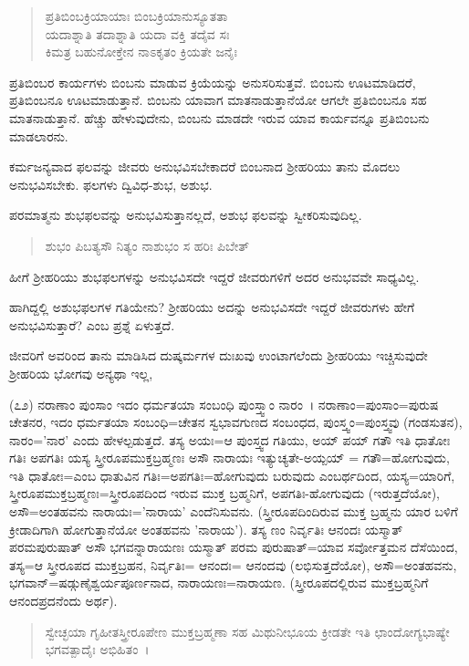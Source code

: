 \begin{verse}
ಪ್ರತಿಬಿಂಬಕ್ರಿಯಾಯಾಃ ಬಿಂಬಕ್ರಿಯಾನುಸ್ಯೂತತಾ\\ ಯದಾಶ್ನಾತಿ ತದಾಶ್ನಾತಿ ಯದಾ ವಕ್ತಿ ತದೈವ ಸಃ\\ ಕಿಮತ್ರ ಬಹುನೋಕ್ತೇನ ನಾಽಕೃತಂ ಕ್ರಿಯತೇ ಜನೈಃ
\end{verse}


ಪ್ರತಿಬಿಂಬರ ಕಾರ್ಯಗಳು ಬಿಂಬನು ಮಾಡುವ ಕ್ರಿಯೆಯನ್ನು ಅನುಸರಿಸುತ್ತವೆ. ಬಿಂಬನು ಊಟಮಾಡಿದರೆ, ಪ್ರತಿಬಿಂಬನೂ ಊಟಮಾಡುತ್ತಾನೆ. ಬಿಂಬನು ಯಾವಾಗ ಮಾತನಾಡುತ್ತಾನೆಯೋ ಆಗಲೇ ಪ್ರತಿಬಿಂಬನೂ ಸಹ ಮಾತನಾಡುತ್ತಾನೆ. ಹೆಚ್ಚು ಹೇಳುವುದೇನು, ಬಿಂಬನು ಮಾಡದೇ ಇರುವ ಯಾವ ಕಾರ್ಯವನ್ನೂ ಪ್ರತಿಬಿಂಬನು ಮಾಡಲಾರನು.

ಕರ್ಮಜನ್ಯವಾದ ಫಲವನ್ನು ಜೀವರು ಅನುಭವಿಸಬೇಕಾದರೆ ಬಿಂಬನಾದ ಶ‍್ರೀಹರಿಯು ತಾನು ಮೊದಲು ಅನುಭವಿಸಬೇಕು. ಫಲಗಳು ದ್ವಿವಿಧ-ಶುಭ, ಅಶುಭ.

ಪರಮಾತ್ಮನು ಶುಭಫಲವನ್ನು ಅನುಭವಿಸುತ್ತಾನಲ್ಲದೆ, ಅಶುಭ ಫಲವನ್ನು ಸ್ವೀಕರಿಸುವುದಿಲ್ಲ.

\begin{verse}
ಶುಭಂ ಪಿಬತ್ಯಸೌ ನಿತ್ಯಂ ನಾಶುಭಂ ಸ ಹರಿಃ ಪಿಬೇತ್
\end{verse}


ಹೀಗೆ ಶ‍್ರೀಹರಿಯು ಶುಭಫಲಗಳನ್ನು ಅನುಭವಿಸದೇ ಇದ್ದರೆ ಜೀವರುಗಳಿಗೆ ಅದರ ಅನುಭವವೇ ಸಾಧ್ಯವಿಲ್ಲ.

ಹಾಗಿದ್ದಲ್ಲಿ ಅಶುಭಫಲಗಳ ಗತಿಯೇನು? ಶ‍್ರೀಹರಿಯು ಅದನ್ನು ಅನುಭವಿಸದೇ ಇದ್ದರೆ ಜೀವರುಗಳು ಹೇಗೆ ಅನುಭವಿಸುತ್ತಾರೆ? ಎಂಬ ಪ್ರಶ್ನೆ ಏಳುತ್ತದೆ.

ಜೀವರಿಗೆ ಅವರಿಂದ ತಾನು ಮಾಡಿಸಿದ ದುಷ್ಕರ್ಮಗಳ ದುಃಖವು ಉಂಟಾಗಲೆಂದು ಶ‍್ರೀಹರಿಯು ಇಚ್ಚಿಸುವುದೇ ಶ‍್ರೀಹರಿಯ ಭೋಗವು ಅನ್ಯಥಾ ಇಲ್ಲ,

(೭೨) ನರಾಣಾಂ ಪುಂಸಾಂ ಇದಂ ಧರ್ಮತಯಾ ಸಂಬಂಧಿ ಪುಂಸ್ತ್ವಾಂ ನಾರಂ~। ನರಾಣಾಂ=ಪುಂಸಾಂ=ಪುರುಷ ಚೇತನರ, ಇದಂ ಧರ್ಮತಯಾ ಸಂಬಂಧಿ=ಚೇತನ ಸ್ವಭಾವಗುಣದ ಸಂಬಂಧದ, ಪುಂಸ್ತ್ವಂ=ಪುಂಸ್ತ್ವವು (ಗಂಡಸುತನ), ನಾರಂ='ನಾರ' ಎಂದು ಹೇಳಲ್ಪಡುತ್ತದೆ. ತಸ್ಯ ಅಯಃ=ಆ ಪುಂಸ್ತ್ವದ ಗತಿಯು, ಅಯ್ ಪಯ್ ಗತೌ ಇತಿ ಧಾತೋಃ ಗತಿಃ ಅಪಗತಿಃ ಯಸ್ಯ ಸ್ತ್ರೀರೂಪಮುಕ್ತಬ್ರಹ್ಮಣಃ ಅಸೌ ನಾರಾಯಃ ಇತ್ಯುಚ್ಯತೇ-ಅಯ್ಪಯ್ = ಗತೌ=ಹೋಗುವುದು, ಇತಿ ಧಾತೋಃ=ಎಂಬ ಧಾತುವಿನ ಗತಿಃ=ಅಪಗತಿಃ=ಹೋಗುವುದು ಬರುವುದು ಎಂಬರ್ಥದಿಂದ, ಯಸ್ಯ=ಯಾರಿಗೆ, ಸ್ತ್ರೀರೂಪಮುಕ್ತಬ್ರಹ್ಮಣಃ=ಸ್ತ್ರೀರೂಪದಿಂದ ಇರುವ ಮುಕ್ತ ಬ್ರಹ್ಮನಿಗೆ, ಅಪಗತಿಃ-ಹೋಗುವುದು (ಇರುತ್ತದೆಯೋ), ಅಸೌ=ಅಂತಹವನು ನಾರಾಯಃ='ನಾರಾಯ' ಎಂದೆನಿಸುವನು. (ಸ್ತ್ರೀರೂಪದಿಂದಿರುವ ಮುಕ್ತ ಬ್ರಹ್ಮನು ಯಾರ ಬಳಿಗೆ ಕ್ರೀಡಾದಿಗಾಗಿ ಹೋಗುತ್ತಾನೆಯೋ ಅಂತಹವನು 'ನಾರಾಯ'). ತಸ್ಯ ಣಂ ನಿರ್ವೃತಿಃ ಆನಂದಃ ಯಸ್ಮಾತ್ ಪರಮಪುರುಷಾತ್ ಅಸೌ ಭಗವನ್ನಾರಾಯಣಃ ಯಸ್ಮಾತ್ ಪರಮ ಪುರುಷಾತ್=ಯಾವ ಸರ್ವೋತ್ತಮನ ದೆಸೆಯಿಂದ, ತಸ್ಯ=ಆ ಸ್ತ್ರೀರೂಪದ ಮುಕ್ತಬ್ರಹನ, ನಿರ್ವೃತಿಃ= ಆನಂದಃ= ಆನಂದವು (ಲಭಿಸುತ್ತದೆಯೋ), ಅಸೌ=ಅಂತಹವನು, ಭಗವಾನ್=ಷಡ್ಗುಣೈಶ್ವರ್ಯಪೂರ್ಣನಾದ, ನಾರಾಯಣಃ=ನಾರಾಯಣ. (ಸ್ತ್ರೀರೂಪದಲ್ಲಿರುವ ಮುಕ್ತಬ್ರಹ್ಮನಿಗೆ ಆನಂದಪ್ರದನೆಂದು ಅರ್ಥ).

\begin{verse}
ಸ್ವೇಚ್ಛಯಾ ಗೃಹೀತಸ್ತ್ರೀರೂಪೇಣ ಮುಕ್ತಬ್ರಹ್ಮಣಾ ಸಹ ಮಿಥುನೀಭೂಯ ಕ್ರೀಡತೇ ಇತಿ ಛಾಂದೋಗ್ಯಭಾಷ್ಯೇ ಭಗವತ್ಪಾದೈಃ ಅಭಿಹಿತಂ~।
\end{verse}

